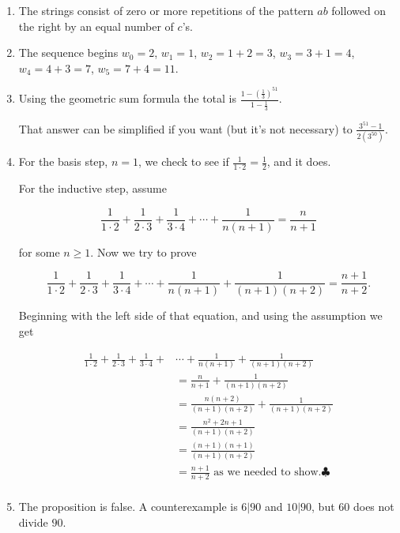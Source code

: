 \begin{enumerate}
\item The strings consist of zero or more repetitions of the pattern $ab$ followed on the
right by an equal number of $c$'s.

\medskip

\item The sequence begins $w_0=2$, $w_1=1$, $w_2 =1+2 = 3$, $w_3 = 3+1 = 4$,
$w_4 = 4+3 = 7$, $w_5 = 7+4 = 11$. 

\medskip

\item Using the geometric sum formula the total is 
$\displaystyle \frac{1- \left(\frac{1}{3}\right)^{51}}{1-\frac{1}{3}}.$

That answer can be simplified if you want (but it's not necessary) to 
$\displaystyle \frac{3^{51}-1}{2(3^{50})}$.
\medskip

\item For the basis step, $n=1$, we check to see if $\displaystyle \frac{1}{1\cdot2}= \frac{1}{2}$, and it does.

For the inductive step, assume 

\[
\frac{1}{1\cdot2}+\frac{1}{2\cdot3}+\frac{1}{3\cdot4}+\cdots+\frac{1}{n(n+1)}= \frac{n}{n+1}
\]

for some $n\geq 1$. Now we try to prove

\[
\frac{1}{1\cdot2}+\frac{1}{2\cdot3}+\frac{1}{3\cdot4}+\cdots+\frac{1}{n(n+1)} +\frac{1}{(n+1)(n+2)}
= \frac{n+1}{n+2}.
\]

Beginning with the left side of that equation, and using the assumption we get

\begin{align*}
\frac{1}{1\cdot2}+\frac{1}{2\cdot3}+\frac{1}{3\cdot4}+&\cdots+\frac{1}{n(n+1)} +\frac{1}{(n+1)(n+2)}\\[5pt]
& = \frac{n}{n+1}+ \frac{1}{(n+1)(n+2)}\\[5pt]
&=  \frac{n(n+2)}{(n+1)(n+2)}+ \frac{1}{(n+1)(n+2)}\\[5pt]
&= \frac{n^2+2n+1}{(n+1)(n+2)}\\[5pt]
&= \frac{(n+1)(n+1)}{(n+1)(n+2)}\\[5pt]
&= \frac{n+1}{n+2} \text{ as we needed to show.}  \clubsuit\\[5pt]
\end{align*}


\medskip

\item The proposition is false. A counterexample is $6|90$ and $10|90$, but $60$ does not divide $90$.


\end{enumerate}
